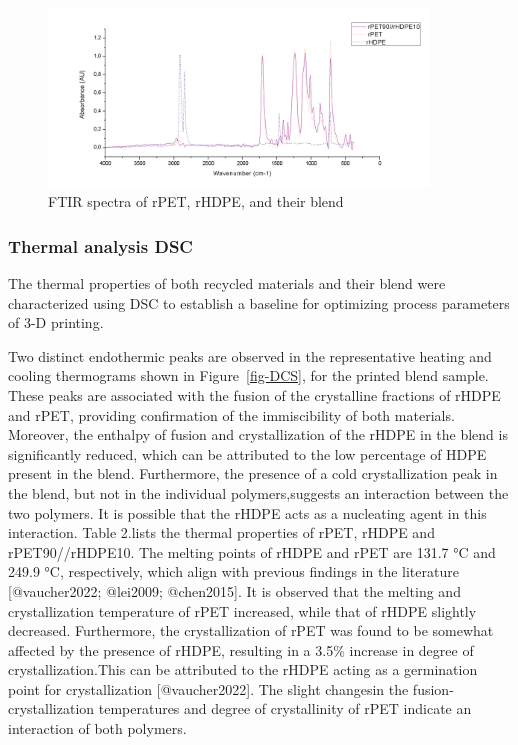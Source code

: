 \documentclass[
  letterpaper,
  DIV=11,
  numbers=noendperiod]{scrartcl}
\begin{document}
\begin{figure}

{\centering \includegraphics[width=0.9\textwidth,height=\textheight]{figures/Figure_7_FTIR.png}

}

\caption{\label{fig-FTIR}FTIR spectra of rPET, rHDPE, and their blend}

\end{figure}

\hypertarget{thermal-analysis-dsc}{%
\subsubsection{Thermal analysis DSC}\label{thermal-analysis-dsc}}

The thermal properties of both recycled materials and their blend were
characterized using DSC to establish a baseline for optimizing process
parameters of 3-D printing.

Two distinct endothermic peaks are observed in the representative
heating and cooling thermograms shown in Figure~\ref{fig-DCS}, for the
printed blend sample. These peaks are associated with the fusion of the
crystalline fractions of rHDPE and rPET, providing confirmation of the
immiscibility of both materials. Moreover, the enthalpy of fusion and
crystallization of the rHDPE in the blend is significantly reduced,
which can be attributed to the low percentage of HDPE present in the
blend. Furthermore, the presence of a cold crystallization peak in the
blend, but not in the individual polymers,suggests an interaction
between the two polymers. It is possible that the rHDPE acts as a
nucleating agent in this interaction. Table 2.lists the thermal
properties of rPET, rHDPE and rPET90//rHDPE10. The melting points of
rHDPE and rPET are 131.7 °C and 249.9 °C, respectively, which align with
previous findings in the literature {[}@vaucher2022; @lei2009;
@chen2015{]}. It is observed that the melting and crystallization
temperature of rPET increased, while that of rHDPE slightly decreased.
Furthermore, the crystallization of rPET was found to be somewhat
affected by the presence of rHDPE, resulting in a 3.5\% increase in
degree of crystallization.This can be attributed to the rHDPE acting as
a germination point for crystallization {[}@vaucher2022{]}. The slight
changesin the fusion-crystallization temperatures and degree of
crystallinity of rPET indicate an interaction of both polymers.
\end{document}
